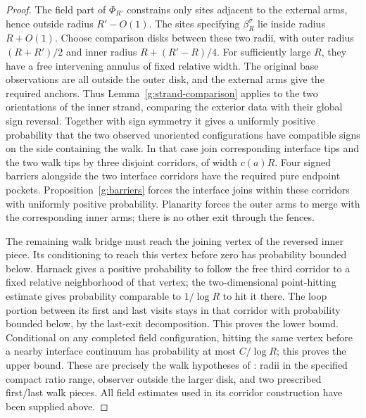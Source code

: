\begin{proof}
The field part of \(\Phi_{R'}\) constrains only sites adjacent to
the external arms, hence outside radius \(R'-O(1)\).
The sites specifying \(\beta_R^\sigma\) lie inside radius \(R+O(1)\).
Choose comparison disks between these two radii, with
outer radius \((R+R')/2\) and inner radius \(R+(R'-R)/4\).
For sufficiently large \(R\), they have a free intervening annulus
of fixed relative width. The original base observations are all
outside the outer disk, and the external arms give the required
anchors. Thus Lemma~\ref{g:strand-comparison} applies to the two
orientations of the inner strand, comparing the exterior data with
their global sign reversal. Together with sign symmetry it gives a uniformly
positive probability that the two observed unoriented configurations
have compatible signs on the side containing the walk. In that case
join corresponding interface tips and the two walk tips by three
disjoint corridors, of width \(c(a)R\). Four signed barriers alongside
the two interface corridors have the required pure endpoint pockets.
Proposition~\ref{g:barriers} forces the interface joins within these
corridors with uniformly positive probability. Planarity forces the
outer arms to merge with the corresponding inner arms; there is no
other exit through the fences.

The remaining walk bridge must reach the joining vertex of the reversed
inner piece. Its conditioning to reach this vertex before zero has
probability bounded below. Harnack gives a positive probability to
follow the free third corridor to a fixed relative neighborhood of
that vertex; the two-dimensional point-hitting estimate gives
probability comparable to \(1/\log R\) to hit it there. The loop portion
between its first and last visits stays in that corridor with probability
bounded below, by the last-exit decomposition. This proves the lower
bound. Conditional on any completed field configuration, hitting the
same vertex before a nearby interface continuum has probability at
most \(C/\log R\); this proves the upper bound. These are precisely
the walk hypotheses of \cite[Lemma 3.14]{SSdiscrete}: radii in the
specified compact ratio range, observer outside the larger disk,
and two prescribed first/last walk pieces. All field estimates used
in its corridor construction have been supplied above.


\end{proof}
